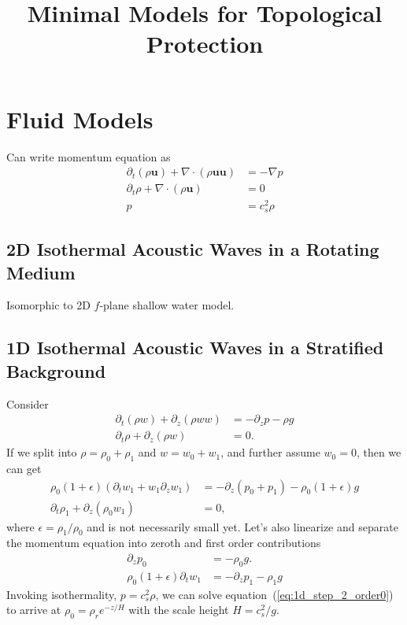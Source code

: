 \documentclass[11pt]{article}
\title{Minimal Models for Topological Protection}
\begin{document}
\maketitle

\section{Fluid Models}
\label{sec:fluids}
Can write momentum equation as
\begin{align}
  \partial_t \left(\rho \mathbf{u} \right) + \nabla \cdot \left(\rho \mathbf{u} \mathbf{u} \right) &= -\nabla p\\
  \partial_t \rho + \nabla \cdot \left( \rho \mathbf{u} \right) &= 0\\
  p &= c_s^2 \rho
\end{align}

\subsection{2D Isothermal Acoustic Waves in a Rotating Medium}
\label{sec:2D_isotherm}
Isomorphic to 2D $f$-plane shallow water model.

\subsection{1D Isothermal Acoustic Waves in a Stratified Background}
\label{sec:1d_acoustic_grav}
Consider
\begin{align}
  \label{eq:1d_start}
  \partial_t \left(\rho w \right) + \partial_z \left(\rho w w \right) &= -\partial_z p - \rho g\\
  \partial_t \rho + \partial_z \left( \rho w \right) &= 0.
\end{align}
If we split into $\rho = \rho_0 + \rho_1$ and $w = w_0 + w_1$, and further assume $w_0 = 0$, then we can get 
\begin{align}
  \label{eq:1d_step_1}
  \rho_0 (1+\epsilon) \left(\partial_t w_1 + w_1 \partial_z w_1 \right) &= -\partial_z \left(p_0 + p_1\right) - \rho_0 (1+\epsilon) g\\
  \partial_t \rho_1 + \partial_z \left( \rho_0 w_1 \right) &= 0,
\end{align}
where $\epsilon = \rho_1/\rho_0$ and is not necessarily small yet.
Let's also linearize and separate the momentum equation into zeroth and first order contributions
\begin{align}
    \partial_z p_0 &= -\rho_0 g.\label{eq:1d_step_2_order0}\\
  \rho_0 (1+\epsilon) \partial_t w_1  &= -\partial_z p_1 - \rho_1 g   \label{eq:1d_step_2}
\end{align}
Invoking isothermality, $p = c_s^2 \rho$, we can solve equation~(\ref{eq:1d_step_2_order0}) to arrive at $\rho_0 = \rho_r e^{-z/H}$ with the scale height $H = c_s^2/g$.
\end{document}
